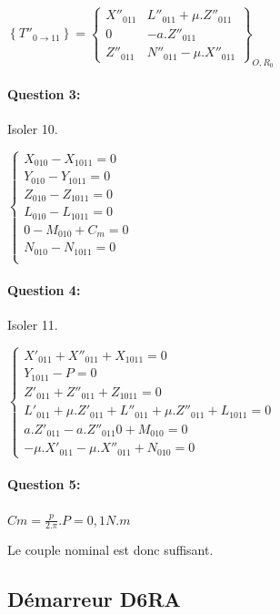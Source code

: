 $\left\{T''_{0\rightarrow 11}\right\}=\left\{
\begin{array}{cc}
X''_{011} & L''_{011}+\mu.Z''_{011} \\
0 & -a.Z''_{011} \\
Z''_{011} & N''_{011}-\mu.X''_{011}
\end{array}
\right\}_{O,R_0}$


\paragraph{Question 3:}

Isoler 10.

$\left\{\begin{array}{l}
X_{010}-X_{1011}=0 \\
Y_{010}-Y_{1011}=0 \\
Z_{010}-Z_{1011}=0 \\
L_{010}-L_{1011}=0 \\
0-M_{010}+C_m=0  \\
N_{010}-N_{1011}=0 \\
\end{array}\right.$

\paragraph{Question 4:}

Isoler 11.

$\left\{\begin{array}{l}
X'_{011}+X''_{011}+X_{1011}=0 \\
Y_{1011}-P=0 \\
Z'_{011}+Z''_{011}+Z_{1011}=0 \\
L'_{011}+\mu.Z'_{011}+L''_{011}+\mu.Z''_{011}+L_{1011}=0 \\
a.Z'_{011}-a.Z''_{011}0+M_{010}=0  \\
-\mu.X'_{011}-\mu.X''_{011}+N_{010}=0
\end{array}\right.$

\paragraph{Question 5:}

$Cm=\frac{p}{2.\pi}.P=0,1N.m$

Le couple nominal est donc suffisant.

\subsection{Démarreur D6RA}

